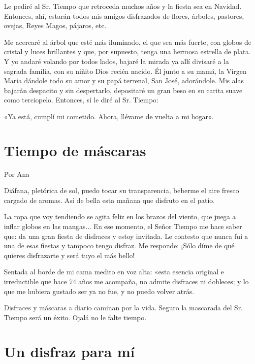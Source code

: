 \documentclass[11pt,twoside,openright,a5paper]{book}
\begin{document}
Le pediré al Sr. Tiempo que retroceda muchos años y la fiesta sea en Navidad. Entonces, ahí, estarán todos mis amigos disfrazados de flores,  árboles, pastores, ovejas, Reyes Magos, pájaros, etc.

Me acercaré al árbol que esté más iluminado, el que sea más fuerte, con globos de cristal y luces brillantes y que, por supuesto, tenga una hermosa estrella de plata. Y yo andaré volando por todos lados, bajaré la mirada ya allí divisaré a la sagrada familia, con su niñito Dios recién nacido. Él junto a su mamá, la Virgen María dándole todo su amor y su papá terrenal, San José, adorándole. Mis alas bajarán despacito y sin despertarlo, depositaré un gran beso en su carita suave como terciopelo. Entonces, sí le diré al Sr. Tiempo: 

«Ya está, cumplí mi cometido. Ahora, llévame de vuelta a mi hogar».

\section*{Tiempo de máscaras}

                                                                                      \begin{flushright}Por Ana\end{flushright}

Diáfana, pletórica de sol, puedo tocar su transparencia, beberme el aire fresco cargado de aromas. Así de bella esta mañana que disfruto en el patio.

La ropa que voy tendiendo se agita feliz en los brazos del viento, que juega a inflar globos en las mangas... En ese momento, el Señor Tiempo me hace saber que: da una gran fiesta de disfraces y estoy invitada. Le contesto que nunca fui a una de esas fiestas y tampoco tengo disfraz. Me responde: ¡Sólo díme de qué quieres disfrazarte y será tuyo el más bello!

Sentada al borde de mi cama medito en voz alta: «esta esencia original e irreductible que hace 74 años me acompaña, no admite disfraces ni dobleces; y lo que me hubiera gustado ser ya no fue, y no puedo volver atrás.

Disfraces y máscaras a diario caminan por la vida. Seguro la mascarada del Sr. Tiempo será un éxito. Ojalá no le falte tiempo.

\section*{Un disfraz para mí}
\end{document}
